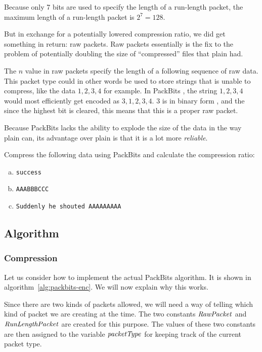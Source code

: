 Because only 7 bits are used to specify the length of a run-length
packet, the maximum length of a run-length packet is $2^7 = 128$.

But in exchange for a potentially lowered compression ratio, we did
get something in return: raw packets. Raw packets essentially is the
fix to the problem of potentially doubling the size of ``compressed''
files that plain \rle had.

The $n$ value in raw packets specify the length of a following
sequence of raw data. This packet type could in other words be used to
store strings that \rle is unable to compress, like the data $1,2,3,4$
for example. In PackBits \rle, the string $1,2,3,4$ would most
efficiently get encoded as $3,1,2,3,4$. $3$ is in binary form , and the since the highest bit is cleared, this means that this
is a proper raw packet.

Because PackBits \rle lacks the ability to explode the size of the
data in the way plain \rle can, its advantage over plain \rle is that
it is a lot more \textit{reliable}.

\begin{Exercise}[label={packbits-rle}]

  Compress the following data using PackBits \rle and calculate the
  compression ratio:

  \begin{enumerate}[(a)]
  \item \texttt{success}
  \item \texttt{AAABBBCCC}
  \item \texttt{Suddenly he shouted AAAAAAAAA}
  \end{enumerate}

\end{Exercise}

\subsection{Algorithm}

\subsubsection{Compression}

Let us consider how to implement the actual PackBits \rle
algorithm. It is shown in algorithm~\ref{alg:packbits-enc}. We will
now explain why this works.

Since there are two kinds of packets allowed, we will need a way of
telling which kind of packet we are creating at the time. The two
constants $\mathit{RawPacket}$ and $\mathit{RunLengthPacket}$ are created
for this purpose. The values of these two constants are then assigned
to the variable $\mathit{packetType}$ for keeping track of the current
packet type.

